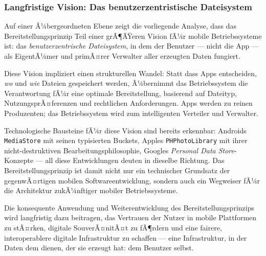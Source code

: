 ﻿\documentclass[12pt, a4paper]{article}
\begin{document}
\subsubsection{Langfristige Vision: Das benutzerzentristische Dateisystem}

Auf einer Ã¼bergeordneten Ebene zeigt die vorliegende Analyse, dass das
Bereitstellungsprinzip Teil einer grÃ¶ÃŸeren Vision fÃ¼r mobile Betriebssysteme ist:
das \emph{benutzerzentrische Dateisystem}, in dem der Benutzer --- nicht die App ---
als EigentÃ¼mer und primÃ¤rer Verwalter aller erzeugten Daten fungiert.

Diese Vision impliziert einen strukturellen Wandel: Statt dass Apps entscheiden,
\emph{wo} und \emph{wie} Dateien gespeichert werden, Ã¼bernimmt das Betriebssystem
die Verantwortung fÃ¼r eine optimale Bereitstellung, basierend auf Dateityp,
NutzungsprÃ¤ferenzen und rechtlichen Anforderungen. Apps werden zu reinen Produzenten;
das Betriebssystem wird zum intelligenten Verteiler und Verwalter.

Technologische Bausteine fÃ¼r diese Vision sind bereits erkennbar: Androids
\texttt{MediaStore} mit seinen typisierten Buckets, Apples \texttt{PHPhotoLibrary}
mit ihrer nicht-destruktiven Bearbeitungsphilosophie, Googles
\emph{Personal Data Store}-Konzepte --- all diese Entwicklungen deuten in dieselbe
Richtung. Das Bereitstellungsprinzip ist damit nicht nur ein technischer Grundsatz
der gegenwÃ¤rtigen mobilen Softwareentwicklung, sondern auch ein Wegweiser fÃ¼r die
Architektur zukÃ¼nftiger mobiler Betriebssysteme.

Die konsequente Anwendung und Weiterentwicklung des Bereitstellungsprinzips wird
langfristig dazu beitragen, das Vertrauen der Nutzer in mobile Plattformen zu stÃ¤rken,
digitale SouverÃ¤nitÃ¤t zu fÃ¶rdern und eine fairere, interoperablere digitale Infrastruktur
zu schaffen --- eine Infrastruktur, in der Daten dem dienen, der sie erzeugt hat:
dem Benutzer selbst.
\end{document}
